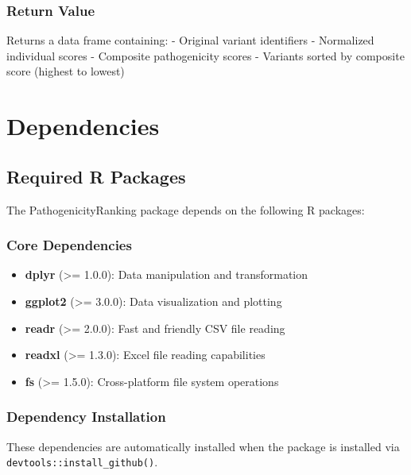 \documentclass[
  11pt,
]{article}
\providecommand{\tightlist}{%
  \setlength{\itemsep}{0pt}\setlength{\parskip}{0pt}}
\begin{document}
\subsubsection{Return Value}\label{return-value}

Returns a data frame containing: - Original variant identifiers -
Normalized individual scores - Composite pathogenicity scores - Variants
sorted by composite score (highest to lowest)

\newpage

\section{Dependencies}\label{dependencies}

\subsection{Required R Packages}\label{required-r-packages}

The PathogenicityRanking package depends on the following R packages:

\subsubsection{Core Dependencies}\label{core-dependencies}

\begin{itemize}
\tightlist
\item
  \textbf{dplyr} (\textgreater= 1.0.0): Data manipulation and
  transformation
\item
  \textbf{ggplot2} (\textgreater= 3.0.0): Data visualization and
  plotting
\item
  \textbf{readr} (\textgreater= 2.0.0): Fast and friendly CSV file
  reading
\item
  \textbf{readxl} (\textgreater= 1.3.0): Excel file reading capabilities
\item
  \textbf{fs} (\textgreater= 1.5.0): Cross-platform file system
  operations
\end{itemize}

\subsubsection{Dependency Installation}\label{dependency-installation}

These dependencies are automatically installed when the package is
installed via \texttt{devtools::install\_github()}.
\end{document}
